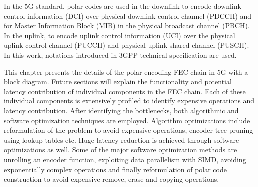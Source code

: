 In the 5G standard, polar codes are used in the downlink to encode downlink control information (DCI) over physical downlink control channel (PDCCH) and for Master Information Block (MIB) in the physical broadcast channel (PBCH). In the uplink, to encode uplink control information (UCI) over the physical uplink control channel (PUCCH) and physical uplink shared channel (PUSCH). In this work, notations introduced in 3GPP technical specification \cite{3gpp.38.212} are used.

This chapter presents the details of the polar encoding FEC chain in 5G with a block diagram. Future sections will explain the functionality and potential latency contribution of individual components in the FEC chain. Each of these individual components is extensively profiled to identify expensive operations and latency contribution. After identifying the bottlenecks, both algorithmic and software optimization techniques are employed. Algorithm optimizations include reformulation of the problem to avoid expensive operations, encoder tree pruning using lookup tables etc. Huge latency reduction is achieved through software optimizations as well. Some of the major software optimization methods are unrolling an encoder function, exploiting data parallelism with SIMD, avoiding exponentially complex operations and finally reformulation of polar code construction to avoid expensive remove, erase and copying operations.


